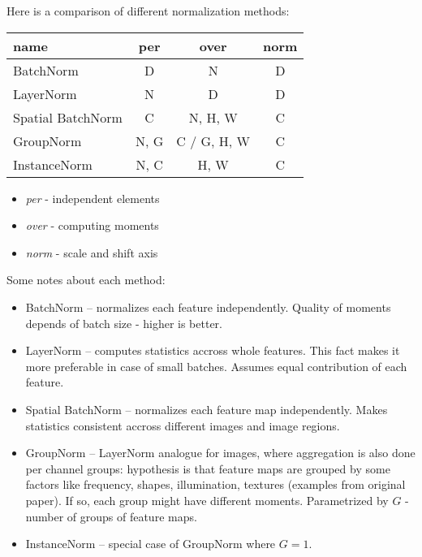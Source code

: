 \documentclass[12pt]{article}
\begin{document}
Here is a comparison of different normalization methods:

\begin{center}
\begin{tabular}{||l c c c||} 
 \hline
 name & per & over & norm \\ [0.5ex] 
 \hline
 \hline 
 
 BatchNorm & D & N & D \\ 
 \hline
 LayerNorm & N & D & D \\
 \hline
 Spatial BatchNorm & C & N, H, W & C \\
 \hline
 GroupNorm & N, G & C / G, H, W & C \\
 \hline
 InstanceNorm & N, C & H, W & C \\ [1ex] 
 \hline
\end{tabular}
\end{center}

\begin{itemize}
\item \textit{per} - independent elements
\item \textit{over} - computing moments
\item \textit{norm} - scale and shift axis
\end{itemize}

Some notes about each method:

\begin{itemize}
\item BatchNorm -- normalizes each feature independently. Quality of moments depends of batch size - higher is better.
\item LayerNorm -- computes statistics accross whole features. This fact makes it more preferable in case of small batches. Assumes equal contribution of each feature.
\item Spatial BatchNorm -- normalizes each feature map independently. Makes statistics consistent accross different images and image regions.
\item GroupNorm -- LayerNorm analogue for images, where aggregation is also done per channel groups: hypothesis is that feature maps are grouped by some factors like frequency, shapes, illumination, textures (examples from original paper). If so, each group might have different moments. Parametrized by $G$ - number of groups of feature maps.
\item InstanceNorm -- special case of GroupNorm where $G = 1$.
\end{itemize}
\end{document}
